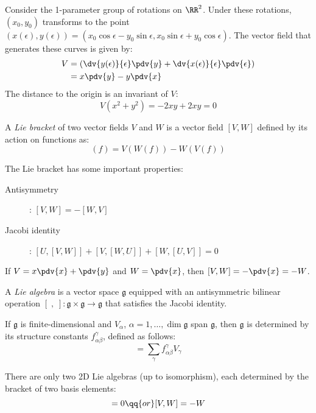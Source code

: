 \documentclass{jknotes}
\begin{document}
\begin{eg}
    Consider the 1-parameter group of rotations on \(\RR^2\). Under these rotations, \((x_0,y_0)\) transforms to the point \((x(\epsilon),y(\epsilon)) = (x_0\cos\epsilon-y_0\sin\epsilon,x_0\sin\epsilon+y_0\cos\epsilon)\). The vector field that generates these curves is given by:
    \begin{align}
        V &= \left( \dv{y(\epsilon)}{\epsilon}\pdv{y} + \dv{x(\epsilon)}{\epsilon}\pdv{\epsilon} \right)\\
        &= x\pdv{y} - y\pdv{x}
    \end{align}
    The distance to the origin is an invariant of \(V\):
    \begin{equation}
        V(x^2+y^2) = -2xy + 2xy = 0
    \end{equation}
\end{eg}
\begin{defn}
    A \emph{Lie bracket} of two vector fields \(V\) and \(W\) is a vector field \([V,W]\) defined by its action on functions as:
    \begin{equation}
        [V,W](f) = V(W(f))-W(V(f))
    \end{equation}
\end{defn}
The Lie bracket has some important properties:
\begin{description}
    \item[Antisymmetry]: \([V,W] = -[W,V]\)
    \item[Jacobi identity]: \([U,[V,W]] + [V,[W,U]] + [W,[U,V]] = 0\)
\end{description}
\begin{eg}
    If \(V = x\pdv{x}+\pdv{y}\) and \(W = \pdv{x}\), then \([V,W] = -\pdv{x} = -W\).
\end{eg}
\begin{defn}
    A \emph{Lie algebra} is a vector space \(\mathfrak{g}\) equipped with an antisymmetric bilinear operation \([\;,\;]:\mathfrak{g}\times\mathfrak{g}\rightarrow\mathfrak{g}\) that satisfies the Jacobi identity.
\end{defn}
If \(\mathfrak{g}\) is finite-dimensional and \(V_\alpha\), \(\alpha = 1,\dots,\dim\mathfrak{g}\) span \(\mathfrak{g}\), then \(\mathfrak{g}\) is determined by its structure constants \(f_{\alpha\beta}^\gamma\), defined as follows:
\begin{equation}
    [V_\alpha,V_\beta] = \sum_\gamma f_{\alpha\beta}^\gamma V_\gamma
\end{equation}
\begin{eg}
    There are only two 2D Lie algebras (up to isomorphism), each determined by the bracket of two basis elements:
    \begin{equation}
        [V,W] = 0 \qq{or} [V,W] = -W
    \end{equation}
\end{eg}
\end{document}
